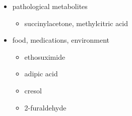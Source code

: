 \documentclass{scrartcl}
\begin{document}
\begin{enumerate}
\begin{itemize}
\item pathological metabolites
\begin{itemize}
\item succinylacetone, methylcitric acid
\end{itemize}

\item food, medications, environment
\begin{itemize}
\item ethosuximide
\item adipic acid
\item cresol
\item 2-furaldehyde
\end{itemize}
\end{itemize}
\end{enumerate}
\end{document}
